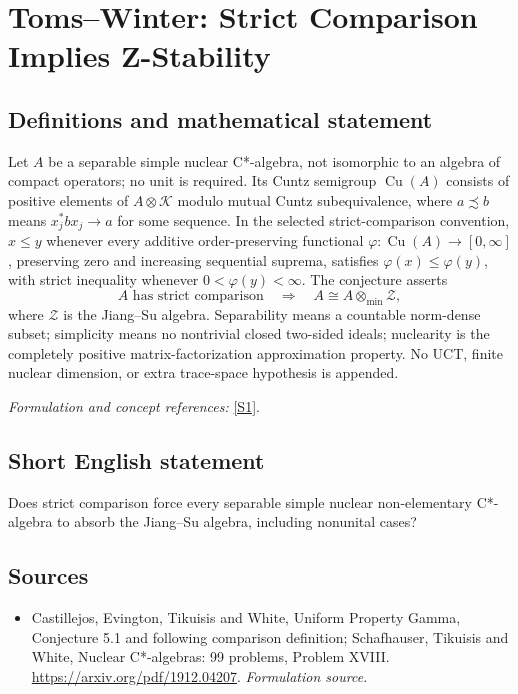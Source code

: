 \documentclass[11pt]{article}
\begin{document}
\section*{\texorpdfstring{Toms–Winter: Strict Comparison Implies Z-Stability}{Toms–Winter: Strict Comparison Implies Z-Stability}}\label{380}
\subsection{Definitions and mathematical statement}
Let $A$ be a separable simple nuclear C*-algebra, not isomorphic to an algebra of compact operators; no unit is required. Its Cuntz semigroup $\operatorname{Cu}(A)$ consists of positive elements of $A\otimes\mathcal K$ modulo mutual Cuntz subequivalence, where $a\precsim b$ means $x_j^*bx_j\to a$ for some sequence. In the selected strict-comparison convention, $x\le y$ whenever every additive order-preserving functional $\varphi:\operatorname{Cu}(A)\to[0,\infty]$, preserving zero and increasing sequential suprema, satisfies $\varphi(x)\le\varphi(y)$, with strict inequality whenever $0<\varphi(y)<\infty$. The conjecture asserts
\[
 A\text{ has strict comparison}\quad\Longrightarrow\quad
 A\cong A\otimes_{\min}\mathcal Z,
\]
where $\mathcal Z$ is the Jiang--Su algebra. Separability means a countable norm-dense subset; simplicity means no nontrivial closed two-sided ideals; nuclearity is the completely positive matrix-factorization approximation property. No UCT, finite nuclear dimension, or extra trace-space hypothesis is appended.
\par\smallskip\textit{Formulation and concept references:} \href{https://arxiv.org/pdf/1912.04207}{[S1]}.

\subsection{Short English statement}
Does strict comparison force every separable simple nuclear non-elementary C*-algebra to absorb the Jiang--Su algebra, including nonunital cases?
\subsection{Sources}
\begin{itemize}
\item[S1]Castillejos, Evington, Tikuisis and White, Uniform Property Gamma, Conjecture 5.1 and following comparison definition; Schafhauser, Tikuisis and White, Nuclear C*-algebras: 99 problems, Problem XVIII.
\url{https://arxiv.org/pdf/1912.04207}.
\textit{Formulation source.}
\end{itemize}
\end{document}
